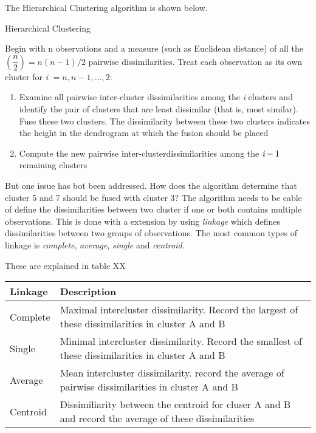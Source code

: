 The Hierarchical Clustering algorithm is shown below.

\begin{algorithm}
	\caption{Hierarchical Clustering}
	\label{algo:HierarchicalClustering}
	\begin{algorithmic}[1]
 		\State Begin with n observations and a measure (such as Euclidean distance) of all the $(\dfrac{n}{2}) =n(n-1)/2 $ pairwise dissimilarities. Treat each observation as its own cluster 
 		\State for \emph{i} $= n,n-1,...,2:$
 		\begin{enumerate}[label=(\alph*)]
 			\item Examine all pairwise inter-cluster dissimilarities among the \emph{i} clusters and identify the pair of clusters that are least dissimilar (that is, most similar). Fuse these two clusters. The dissimilarity between these two clusters indicates the height in the dendrogram at which the fusion should be placed 
 			\item Compute the new pairwise inter-clusterdissimilarities among the $\emph{i}-1$ remaining clusters  
 		\end{enumerate}
 	\end{algorithmic}
 \end{algorithm}

But one issue has bot been addressed. How does the algorithm determine that cluster 5 and 7 should be fused with cluster 3? The algorithm needs to be cable of define the dissimilarities between two cluster if one or both contains multiple observations. This is done with a extension by using \emph{linkage} which defines dissimilarities between two groups of observations. The most common types of linkage is \emph{complete}, \emph{average}, \emph{single} and
\emph{centroid}.

These are explained in table XX
\begin{center}
	\begin{tabular}{ | l | p{12cm} |}
		\hline
		Linkage & Description \\ \hline
		Complete & Maximal intercluster dissimilarity. Record the largest of these dissimilarities in cluster A and B \\ \hline
		Single & Minimal intercluster dissimilarity. Record the smallest of these dissimilarities in cluster A and B \\ \hline
		Average & Mean intercluster dissimilarity. record the average of pairwise dissimilarities in cluster A and B\\
		\hline
		Centroid & Dissimiliarity between the centroid for cluser A and B and record the average of these dissimilarities
		\\
		\hline
	\end{tabular}
\end{center}

